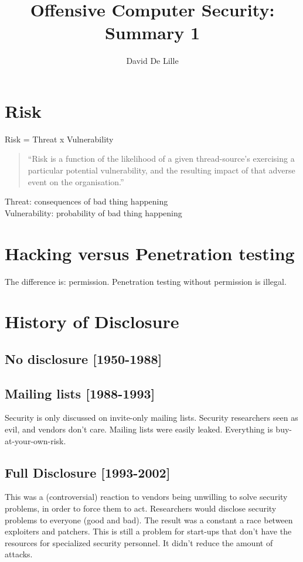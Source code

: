 \documentclass[letterpaper]{article}
\author{David De Lille}
\title{Offensive Computer Security: Summary 1}
\begin{document}
\maketitle

\section{Risk}
Risk = Threat x Vulnerability

\begin{quote}
``Risk is a function of the likelihood of a given thread-source's exercising a particular potential vulnerability, and the resulting impact of that adverse event on the organisation.''
\end{quote}

Threat: consequences of bad thing happening\\
Vulnerability: probability of bad thing happening

\section{Hacking versus Penetration testing}
The difference is: permission. Penetration testing without permission is illegal.

\section{History of Disclosure}
\setcounter{subsection}{-1}	%
\subsection{No disclosure [1950-1988]}
\subsection{Mailing lists [1988-1993]}
Security is only discussed on invite-only mailing lists. Security researchers seen as evil, and vendors don't care. Mailing lists were easily leaked. Everything is buy-at-your-own-risk.

\subsection{Full Disclosure [1993-2002]}
This was a (controversial) reaction to vendors being unwilling to solve security problems, in order to force them to act. Researchers would disclose security problems to everyone (good and bad).
The result was a constant a race between exploiters and patchers. This is still a problem for start-ups that don't have the resources for specialized security personnel. It didn't reduce the amount of attacks.
\end{document}
